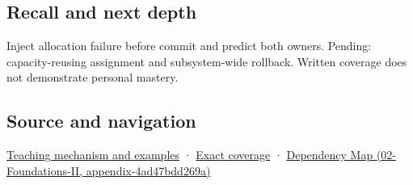 \subsection{Recall and next depth}\label{appendix-bea6beb5350f-recall-and-next-depth}

Inject allocation failure before commit and predict both owners. Pending: capacity-reusing assignment and subsystem-wide rollback. Written coverage does not demonstrate personal mastery.

\subsection{Source and navigation}\label{appendix-bea6beb5350f-source-and-navigation}

\hyperref[01-foundations-i-ch003-replacing-a-value-is-not-creating-an-object]{Teaching mechanism and examples} · \hyperref[appendix-fd090d982a15-m009---parts-127-147]{Exact coverage} · \href{../02-Foundations-II/main.pdf\#nameddest=appendix-4ad47bdd269a}{Dependency Map (02-Foundations-II, appendix-4ad47bdd269a)}
